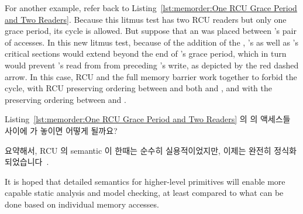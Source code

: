 For another example, refer back to
Listing~\ref{lst:memorder:One RCU Grace Period and Two Readers}.
Because this litmus test has two RCU readers but only one grace period,
its cycle is allowed.
But suppose that an  was placed between 's
pair of accesses.
In this new litmus test, because of the addition of the ,
's as well as 's critical sections would extend beyond the
end of 's grace period, which in turn would prevent 's
read from  from preceding 's write, as depicted by the
red dashed arrow.
In this case, RCU and the full memory barrier work together to forbid
the cycle, with RCU preserving ordering between  and both
 and , and with the  preserving
ordering between  and .
\fi

\QuickQuiz{}
	Listing~\ref{lst:memorder:One RCU Grace Period and Two Readers}
	의  의 액세스들 사이에  가 놓이면 어떻게 될까요?

\QuickQuizAnswer{
	사이클은 역시 사라질 겁니다.
	더 분석해 보는건 독자 여러분의 몫으로 둡니다.

} \QuickQuizEnd

요약해서, RCU 의 semantic 이 한때는 순수히 실용적이었지만, 이제는 완전히 정식화
되었습니다~\cite{PaulMcKenney2005RCUSemantics,MathieuDesnoyers2012URCU,AlexeyGotsman2013ESOPRCU,Alglave:2018:FSC:3173162.3177156}.

It is hoped that detailed semantics for higher-level primitives will
enable more capable static analysis and model checking, at least compared
to what can be done based on individual memory accesses.

